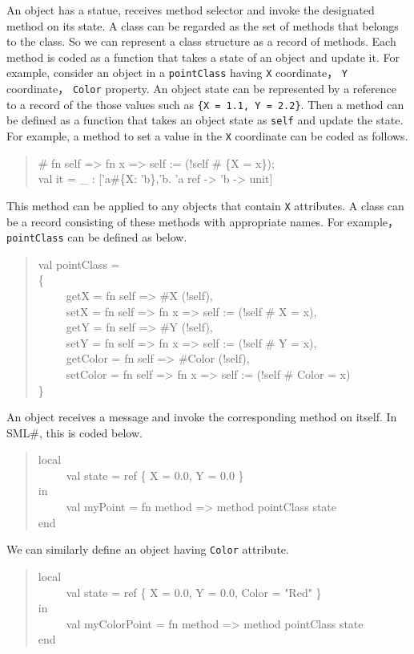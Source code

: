 \documentclass{jbook}
\newcommand{\smlsharp}{SML\#}
\newenvironment{program}{\begin{tt}\begin{quote}}{\end{quote}\end{tt}}
\newcommand{\myem}{\ \ \ \ \  }
\begin{document}
	An object has a statue, receives method selector and invoke the
designated method on its state.
	A class can be regarded as the set of methods that belongs to the
class.
	So we can represent a class structure as a record of methods.
	Each method is coded as a function that takes a state of an
object and update it. 
	For example, consider an object in a {\tt pointClass} having
{\tt X} coordinate，
{\tt Y} coordinate，
{\tt Color} property.
	An object state can be represented by a reference to a record of
the those values such as {\tt \{X = 1.1, Y = 2.2\}}. 
	Then a method can be defined as a function that takes an object
state as {\tt self} and update the state.
	For example, a method to set a value in the {\tt X} coordinate
can be coded as follows.
\begin{program}
\# fn self => fn x => self := (!self \# \{X = x\});\\
val it = \_ : ['a\#\{X: 'b\},'b. 'a ref -> 'b -> unit]
\end{program}
	This method can be applied to any objects that contain 
{\tt X} attributes.
	A class can be a record consisting of these methods with
appropriate names.
	For example，{\tt pointClass} can be defined as below.
\begin{program}
val pointClass =\\
\{\\
\myem  getX = fn self => \#X (!self),\\
\myem  setX = fn self => fn x => self := (!self \# {X = x}),\\
\myem  getY = fn self => \#Y (!self),\\
\myem  setY = fn self => fn x => self := (!self \# {Y = x}),\\
\myem  getColor = fn self => \#Color (!self),\\
\myem  setColor = fn self => fn x => self := (!self \# {Color = x})\\
\}
\end{program}
	An object receives a message and invoke the corresponding method
on itself.
	In \smlsharp{}, this is coded below.
\begin{program}
local\\
\myem  val state =  ref \{ X = 0.0, Y = 0.0 \}\\
in \\
\myem val myPoint = fn method => method pointClass state\\
end
\end{program}
	We can similarly define an object having {\tt Color} attribute.
\begin{program}
local\\
\myem  val state =  ref \{ X = 0.0, Y = 0.0, Color = "Red" \}\\
in \\
\myem val myColorPoint = fn method => method pointClass state\\
end
\end{program}
\end{document}
